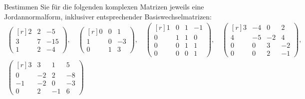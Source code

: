 \documentclass[a4paper,10pt]{scrartcl}
\begin{document}
\begin{question}
  Bestimmen Sie für die folgenden komplexen Matrizen jeweils eine Jordannormalform, inklusiver entsprechender Basiswechselmatrizen:
  \begin{gather*}
    \begin{pmatrix*}[r]
      2 & 2 &  -5 \\
      3 & 7 & -15 \\
      1 & 2 &  -4
    \end{pmatrix*},
    \quad
    \begin{pmatrix*}[r]
      0 & 0 &  1 \\
      1 & 0 & -3 \\
      0 & 1 &  3
    \end{pmatrix*},
    \quad
    \begin{pmatrix*}[r]
      1 & 0 & 1 & -1  \\
      0 & 1 & 1 &  0  \\
      0 & 0 & 1 &  1  \\
      0 & 0 & 0 &  1
    \end{pmatrix*},
    \quad
    \begin{pmatrix*}[r]
      3 & -4  &  0  &  2  \\
      4 & -5  & -2  &  4  \\
      0 &  0  &  3  & -2  \\
      0 &  0  &  2  & -1
    \end{pmatrix*},
  \\
    \begin{pmatrix*}[r]
       3  &  3  &  1  &  5  \\
       0  & -2  &  2  & -8  \\
      -1  & -2  &  0  & -3  \\
       0  &  2  & -1  &  6
    \end{pmatrix*}
  \end{gather*}
\end{question}
\end{document}
